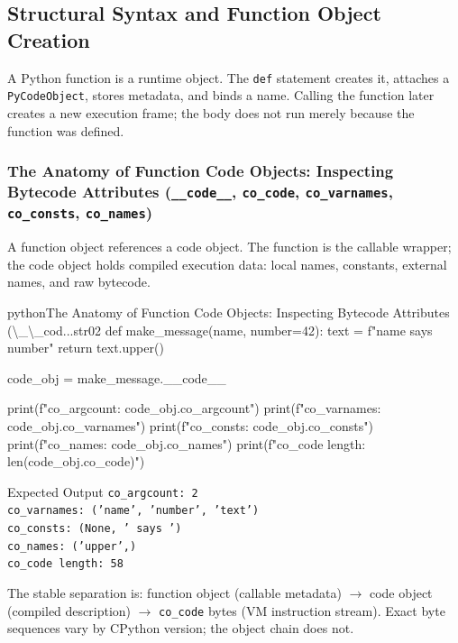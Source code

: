 \subsection{Structural Syntax and Function Object Creation}

A Python function is a runtime object. The \texttt{def} statement creates it, attaches a \texttt{PyCodeObject}, stores metadata, and binds a name. Calling the function later creates a new execution frame; the body does not run merely because the function was defined.

\subsubsection{The Anatomy of Function Code Objects: Inspecting Bytecode Attributes (\texttt{\_\_code\_\_}, \texttt{co\_code}, \texttt{co\_varnames}, \texttt{co\_consts}, \texttt{co\_names})}

A function object references a code object. The function is the callable wrapper; the code object holds compiled execution data: local names, constants, external names, and raw bytecode.

\begin{codebox}[]{python}{The Anatomy of Function Code Objects: Inspecting Bytecode Attributes (\textbackslash{}\_\textbackslash{}\_cod...}{str02}
def make_message(name, number=42):
    text = f"{name} says {number}"
    return text.upper()

code_obj = make_message.__code__

print(f"co_argcount:    {code_obj.co_argcount}")
print(f"co_varnames:    {code_obj.co_varnames}")
print(f"co_consts:      {code_obj.co_consts}")
print(f"co_names:       {code_obj.co_names}")
print(f"co_code length: {len(code_obj.co_code)}")
\end{codebox}


\begin{iobox}{Expected Output}
\texttt{co\_argcount:    2} \\
\texttt{co\_varnames:    ('name', 'number', 'text')} \\
\texttt{co\_consts:      (None, ' says ')} \\
\texttt{co\_names:       ('upper',)} \\
\texttt{co\_code length: 58} \\
\end{iobox}




The stable separation is: function object (callable metadata) $\rightarrow$ code object (compiled description) $\rightarrow$ \texttt{co\_code} bytes (VM instruction stream). Exact byte sequences vary by CPython version; the object chain does not.

